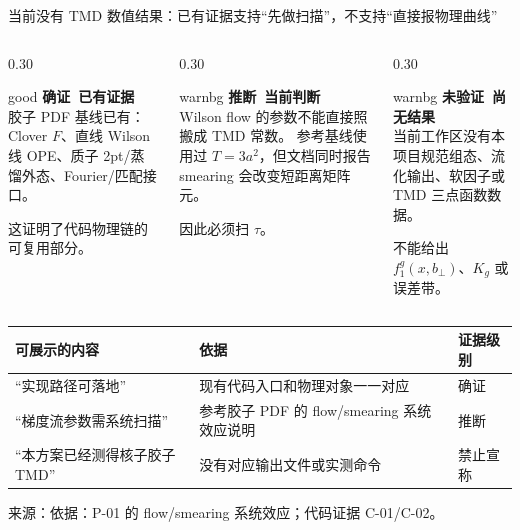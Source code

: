 \documentclass[UTF8,aspectratio=169,11pt]{ctexbeamer}
\newcommand{\source}[1]{%
  \par\vspace{0.05em}%
  {\raggedright\scriptsize\color{muted}来源：#1\par}}
\newcommand{\verified}{\textcolor{evidence}{确证}}
\newcommand{\inferred}{\textcolor{accent}{推断}}
\newcommand{\unverified}{\textcolor{warning}{未验证}}
\begin{document}
\begin{frame}[t]{当前没有 TMD 数值结果：已有证据支持“先做扫描”，不支持“直接报物理曲线”}
  \begin{columns}[T,totalwidth=\textwidth]
    \begin{column}{0.30\textwidth}
      \begin{beamercolorbox}[wd=\linewidth,sep=0.45em,rounded=true]{good}
        \textbf{\verified\ 已有证据}\\[0.25em]
        胶子 PDF 基线已有：
        Clover $F$、直线 Wilson 线 OPE、质子 2pt/蒸馏外态、Fourier/匹配接口。

        这证明了代码物理链的可复用部分。
      \end{beamercolorbox}
    \end{column}
    \begin{column}{0.30\textwidth}
      \begin{beamercolorbox}[wd=\linewidth,sep=0.45em,rounded=true]{warnbg}
        \textbf{\inferred\ 当前判断}\\[0.25em]
        Wilson flow 的参数不能直接照搬成 TMD 常数。
        参考基线使用过 $T=3a^2$，但文档同时报告 smearing 会改变短距离矩阵元。

        因此必须扫 $\tau$。
      \end{beamercolorbox}
    \end{column}
    \begin{column}{0.30\textwidth}
      \begin{beamercolorbox}[wd=\linewidth,sep=0.45em,rounded=true]{warnbg}
        \textbf{\unverified\ 尚无结果}\\[0.25em]
        当前工作区没有本项目规范组态、流化输出、软因子或 TMD 三点函数数据。

        不能给出 $f_1^g(x,b_\perp)$、$K_g$ 或误差带。
      \end{beamercolorbox}
    \end{column}
  \end{columns}
  \vspace{-0.45em}
  \begin{tabularx}{\textwidth}{@{}lXl@{}}
    \toprule
    可展示的内容 & 依据 & 证据级别 \\
    \midrule
    “实现路径可落地” & 现有代码入口和物理对象一一对应 & \verified \\
    “梯度流参数需系统扫描” & 参考胶子 PDF 的 flow/smearing 系统效应说明 & \inferred \\
    “本方案已经测得核子胶子 TMD” & 没有对应输出文件或实测命令 & \textcolor{warning}{禁止宣称} \\
    \bottomrule
  \end{tabularx}
  \source{依据：P-01 的 flow/smearing 系统效应；代码证据 C-01/C-02。}
\end{frame}
\end{document}
